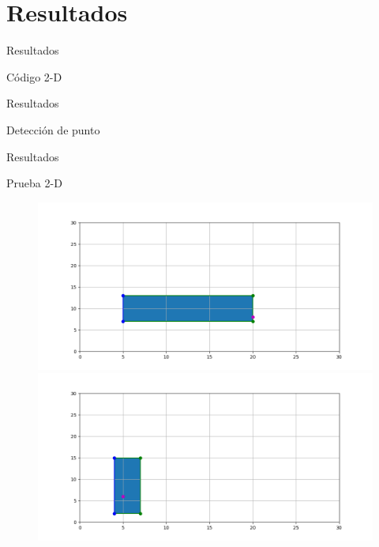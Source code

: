 \documentclass[11pt]{beamer}
\begin{document}
\section{Resultados}
\begin{frame}{Resultados}
 \begin{block}{Código 2-D}
  
 \end{block}
\end{frame}

\begin{frame}{Resultados}
 \begin{block}{Detección de punto}
  
 \end{block}
\end{frame}

\begin{frame}{Resultados}
 \begin{block}{Prueba 2-D}
\begin{figure}
 \includegraphics[width = 0.6\linewidth]{img/Figura_arista}
 \includegraphics[width = 0.6\linewidth]{img/Figura_dentro}
\end{figure}
 \end{block}
\end{frame}
\end{document}
